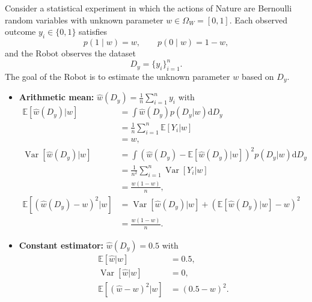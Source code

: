 \begin{example}
	\label{ex:bernoulli_quad_cost}
	Consider a statistical experiment in which the actions of Nature are Bernoulli random variables with unknown parameter $w \in \Omega_W = [0,1]$. Each observed outcome $y_i \in \{0,1\}$ satisfies
	\begin{equation}
		p(1 \mid w) = w, \qquad p(0 \mid w) = 1-w,
	\end{equation}
	and the Robot observes the dataset
	\begin{equation}
		D_y = \{y_i\}_{i=1}^n.
	\end{equation}
	The goal of the Robot is to estimate the unknown parameter $w$ based on $D_y$.
	\begin{itemize}
		\item \textbf{Arithmetic mean:} 
		\(
		\hat{w}(D_y) = \frac{1}{n}\sum_{i=1}^n y_i
		\)
		with 
		\begin{equation} 
			\begin{split} 
				\mathbb{E}[\hat{w}(D_y)|w] &= \int \hat{w}(D_y) p(D_y|w) \mathrm{d}D_y\\ & = \frac{1}{n} \sum_{i=1}^n \mathbb{E}[Y_{i}|w]\\ & = w,\\ \operatorname{Var}[\hat{w}(D_y)|w] & =\int (\hat{w}(D_y)-\mathbb{E}[\hat{w}(D_y)|w])^2 p(D_y|w) \mathrm{d}D_y\\ &= \frac{1}{n^2} \sum_{i=1}^n \operatorname{Var}[Y_{i}|w]\\ & = \frac{w(1-w)}{n},\\ \mathbb{E}[(\hat{w}(D_y)-w)^2|w] &= \operatorname{Var}[\hat{w}(D_y)|w]+(\mathbb{E}[\hat{w}(D_y)|w]-w)^2\\ & = \frac{w(1-w)}{n}. 
			\end{split} 
		\end{equation}
		
		\item \textbf{Constant estimator:} 
		\(
		\hat{w}(D_y) = 0.5
		\)
		with 
		\begin{equation} 
			\begin{split} 
				\mathbb{E}[\hat{w}|w] &= 0.5,\\ \operatorname{Var}[\hat{w}|w] &= 0,\\ \mathbb{E}[(\hat{w}-w)^2|w] &= (0.5 - w)^2. 
			\end{split} 
			\end{equation}
		

\end{itemize}
\end{example}
